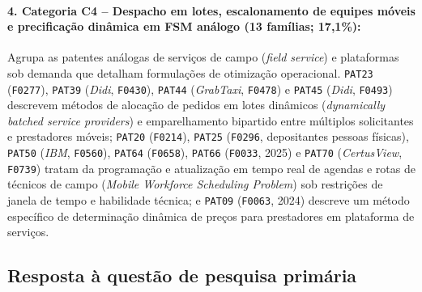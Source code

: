 \documentclass[12pt,a4paper]{article}
\begin{document}
\paragraph{4. Categoria C4 -- Despacho em lotes, escalonamento de equipes móveis e precificação dinâmica em FSM análogo (13 famílias; 17,1\%):}
Agrupa as patentes análogas de serviços de campo (\textit{field service}) e plataformas sob demanda que detalham formulações de otimização operacional. \texttt{PAT23} (\texttt{F0277}), \texttt{PAT39} (\textit{Didi}, \texttt{F0430}), \texttt{PAT44} (\textit{GrabTaxi}, \texttt{F0478}) e \texttt{PAT45} (\textit{Didi}, \texttt{F0493}) descrevem métodos de alocação de pedidos em lotes dinâmicos (\textit{dynamically batched service providers}) e emparelhamento bipartido entre múltiplos solicitantes e prestadores móveis; \texttt{PAT20} (\texttt{F0214}), \texttt{PAT25} (\texttt{F0296}, depositantes pessoas físicas), \texttt{PAT50} (\textit{IBM}, \texttt{F0560}), \texttt{PAT64} (\texttt{F0658}), \texttt{PAT66} (\texttt{F0033}, 2025) e \texttt{PAT70} (\textit{CertusView}, \texttt{F0739}) tratam da programação e atualização em tempo real de agendas e rotas de técnicos de campo (\textit{Mobile Workforce Scheduling Problem}) sob restrições de janela de tempo e habilidade técnica; e \texttt{PAT09} (\texttt{F0063}, 2024) descreve um método específico de determinação dinâmica de preços para prestadores em plataforma de serviços.

\subsection{Resposta à questão de pesquisa primária}
\end{document}
